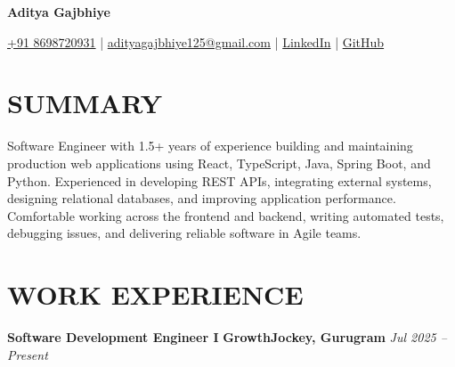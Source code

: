 \documentclass[a4paper,10pt]{article}
\newcommand{\rolerow}[3]{%
    \noindent
    {\bfseries\color{dark}#1}\enspace
    {\bfseries\color{accent}#2}%
    \hfill{\small\color{light}\itshape #3}%
}
\begin{document}
\pagestyle{empty}


\begin{center}
    {\LARGE\bfseries\color{dark} Aditya Gajbhiye}

    \smallskip

    \small
    \href{tel:+918698720931}{+91 8698720931}
    \enspace|\enspace
    \href{mailto:adityagajbhiye125@gmail.com}
    {adityagajbhiye125@gmail.com}
    \enspace|\enspace
    \href{https://linkedin.com/in/aditya-gajbhiye-9b6048230}
    {LinkedIn}
    \enspace|\enspace
    \href{https://github.com/OneCODE2}
    {GitHub}
\end{center}

\vspace{2pt}


\section{SUMMARY}

Software Engineer with 1.5+ years of experience building and maintaining
production web applications using React, TypeScript, Java, Spring Boot,
and Python. Experienced in developing REST APIs, integrating external
systems, designing relational databases, and improving application
performance. Comfortable working across the frontend and backend,
writing automated tests, debugging issues, and delivering reliable
software in Agile teams.


\section{WORK EXPERIENCE}

\rolerow{Software Development Engineer I}
{GrowthJockey, Gurugram}{Jul 2025 -- Present}

\vspace{2pt}
\end{document}
